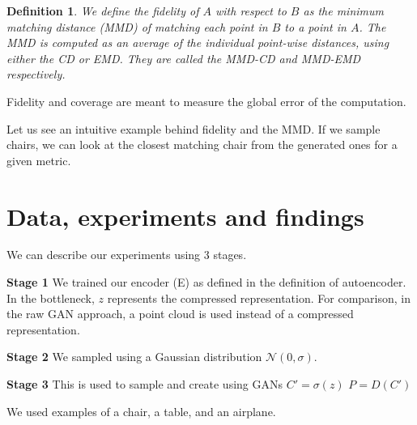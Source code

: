 \documentclass[12pt]{article}
\newtheorem{definition}{Definition}
\newcommand{\contentdescription}[1]{}
\begin{document}
    \begin{definition}
        We define the \emph{fidelity} of $A$ with respect to $B$ as the \emph{minimum matching distance} (MMD) of matching each point in $B$ to a point in $A$.
        The \emph{MMD} is computed as an average of the individual point-wise distances, using either the CD or EMD.
        They are called the \emph{MMD-CD} and \emph{MMD-EMD} respectively.
    \end{definition}

    Fidelity and coverage are meant to measure the global error of the computation.

    Let us see an intuitive example behind fidelity and the MMD.
    If we sample chairs, we can look at the closest matching chair from the generated ones for a given metric.


    \section{Data, experiments and findings}
    \contentdescription{
        Data, experiments and findings (30-40\%):
        Describe the data you are working with for your project.
        What type of data is it?
        Where did it come from?
        How much data are you working with?
        Did you have to do any preprocessing, filtering, or other special treatment to use this data in your project?
        Describe and present the experiments that you performed and what is the reason for those experiments.
        Where applicable define evaluation metrics that you used. Discuss the results that you got.
    }

    We can describe our experiments using 3 stages.

    \textbf{Stage 1}
    We trained our encoder (E) as defined in the definition of autoencoder.
    In the bottleneck, $z$ represents the compressed representation.
    For comparison, in the raw GAN approach, a point cloud is used instead of a compressed representation.

    \textbf{Stage 2}
    We sampled using a Gaussian distribution $\mathcal{N}(0,\sigma)$.

    \textbf{Stage 3}
    This is used to sample and create using GANs
    $C' = \sigma(z)$
    $P = D(C')$

    We used examples of a chair, a table, and an airplane.
\end{document}
